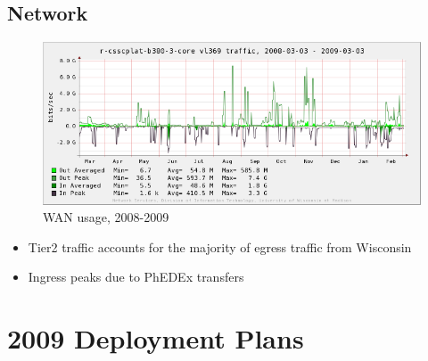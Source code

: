 \documentclass{beamer}
\begin{document}
\subsection{Network}
\begin{frame}
\begin{figure}
    \includegraphics[width=\textwidth]{Graphics/network-1yr.png}
    \caption{WAN usage, 2008-2009}
\end{figure}

\begin{itemize}
    \item Tier2 traffic accounts for the majority of egress traffic from Wisconsin
    \item Ingress peaks due to PhEDEx transfers
\end{itemize}
\end{frame}

\section{2009 Deployment Plans}
\end{document}
